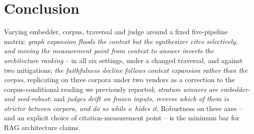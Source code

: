 \section{Conclusion}
\label{sec:conclusion}
Varying embedder, corpus, traversal and judge around a fixed
five-pipeline matrix: \emph{graph expansion floods the context but the
synthesizer cites selectively, and moving the measurement point from
context to answer inverts the architecture ranking} -- in all six
settings, under a changed traversal, and against two mitigations;
\emph{the faithfulness decline follows context expansion rather than the
corpus}, replicating on three corpora under two vendors as a correction
to the corpus-conditional reading we previously reported; \emph{stratum
winners are embedder- and seed-robust}; and \emph{judges drift on frozen
inputs, reverse which of them is stricter between corpora, and do so
while $\kappa$ hides it}. Robustness on these axes -- and an
explicit choice of citation-measurement point -- is the minimum bar for
RAG architecture claims.
